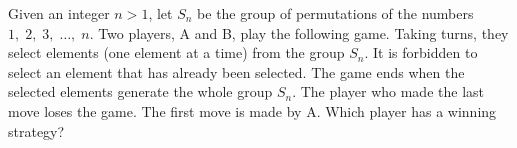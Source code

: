 Given an integer $n>1$, let $S_n$ be the group of permutations of the numbers $1,\;2,\;3,\;\ldots,\;n$. Two players, A and B, play the following game. Taking turns, they select elements (one element at a time) from the group $S_n$. It is forbidden to select an element that has already been selected. The game ends when the selected elements generate the whole group $S_n$. The player who made the last move loses the game. The first move is made by A. Which player has a winning strategy?

